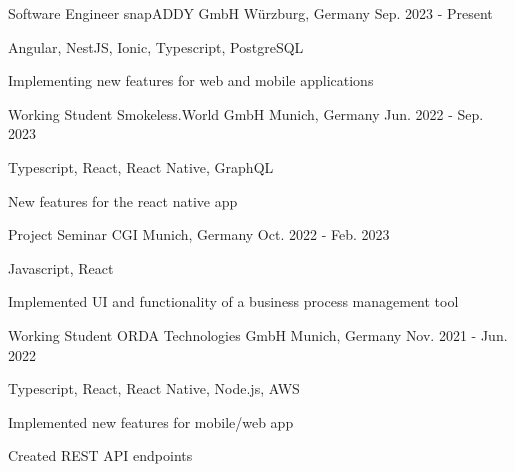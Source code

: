 

\begin{cventries}

  \cventry
  {Software Engineer} %
  {snapADDY GmbH} %
  {Würzburg, Germany} %
  {Sep. 2023 - Present} %
  {
    \begin{cvitems} %
      \item {Angular, NestJS, Ionic, Typescript, PostgreSQL}
      \item {Implementing new features for web and mobile applications}
    \end{cvitems}
  }


  \cventry
  {Working Student} %
  {Smokeless.World GmbH} %
  {Munich, Germany} %
  {Jun. 2022 - Sep. 2023} %
  {
    \begin{cvitems} %
      \item {Typescript, React, React Native, GraphQL}
      \item {New features for the react native app}
    \end{cvitems}
  }



  \cventry
  {Project Seminar} %
  {CGI} %
  {Munich, Germany} %
  {Oct. 2022 - Feb. 2023} %
  {
    \begin{cvitems} %
      \item {Javascript, React}
      \item {Implemented UI and functionality of a business process management tool}
    \end{cvitems}
  }



  \cventry
  {Working Student} %
  {ORDA Technologies GmbH} %
  {Munich, Germany} %
  {Nov. 2021 - Jun. 2022} %
  {
    \begin{cvitems} %
      \item {Typescript, React, React Native, Node.js, AWS}
      \item {Implemented new features for mobile/web app}
      \item {Created REST API endpoints}
    \end{cvitems}
  }




\end{cventries}
